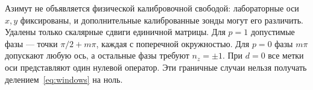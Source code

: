 {Азимут не объявляется физической калибровочной свободой: лабораторные оси $x,y$ фиксированы, и дополнительные калиброванные зонды могут его различить. Удалены только скалярные сдвиги единичной матрицы. Для $p=1$ допустимые фазы --- точки $\pi/2+m\pi$, каждая с поперечной окружностью. Для $p=0$ фазы $m\pi$ допускают любую ось, а остальные фазы требуют $n_z=\pm1$. При $d=0$ все метки оси представляют один нулевой оператор. Эти граничные случаи нельзя получать делением~\eqref{eq:windows} на ноль.}

